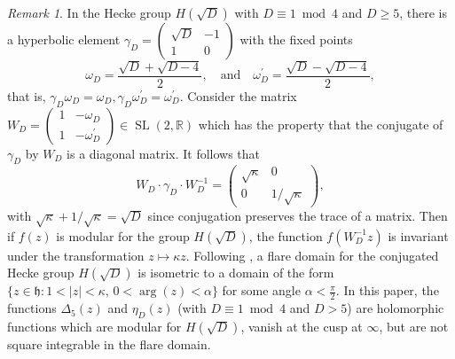 \documentclass[11pt]{amsart}
\numberwithin{equation}{section}
\newtheorem{lem}[thm]{Lemma}
\theoremstyle{remark}
\newtheorem{rem}[thm]{Remark}
\begin{document}

\begin{rem} In the Hecke group $H(\sqrt{D})$ with $D\equiv 1\bmod{4}$ and $D\geq 5$, there is a hyperbolic element $\gamma_D = \left(\begin{smallmatrix} \sqrt{D}&-1\\1&0\end{smallmatrix}\right)$ with the fixed points
$$
\omega_D=\frac{\sqrt{D}+\sqrt{D-4}}{2}, \quad \textrm{and} \quad \omega_D^{\prime}=\frac{\sqrt{D}-\sqrt{D-4}}{2},
$$
that is, $\gamma_D \omega_D=\omega_D, \gamma_D \omega_D^{\prime}=\omega^{\prime}_D$. Consider the matrix $W_D=\left(\begin{smallmatrix} 1&-\omega_D\\1&-\omega_D^{\prime}\end{smallmatrix}\right)
\in \operatorname{SL}(2, \mathbb{R})$ which has the property that the conjugate of $\gamma_D$ by $W_D$ is a diagonal matrix. It follows that
$$
W_D \cdot \gamma_D \cdot W_D^{-1}=\left(\begin{array}{cc}
\sqrt{\kappa} & 0 \\
0 & 1 / \sqrt{\kappa}
\end{array}\right),
$$
with $\sqrt{\kappa}+1/\sqrt{\kappa}=\sqrt{D}$ since conjugation preserves the trace of a matrix. Then if $f(z)$ is modular for the group $H(\sqrt{D})$, the function $f\left(W_D^{-1} z\right)$ is invariant under the transformation $z \mapsto \kappa z$. Following \cite{Kontorovich}, a flare domain for the conjugated Hecke group $H(\sqrt{D})$ is isometric to a domain of the form $\{z \in \mathfrak{h}: 1<|z|<\kappa, \, 0<\arg (z)<\alpha\}$ for some angle $\alpha<\tfrac{\pi}{2}$. In this paper, the functions $\Delta_5(z)$ and $\eta_D(z)$ (with $D\equiv 1\bmod{4}$ and $D> 5$) are holomorphic functions which are modular for $H(\sqrt{D})$, vanish at the cusp at $\infty$, but are not square integrable in the flare domain.
\end{rem}
\end{document}

